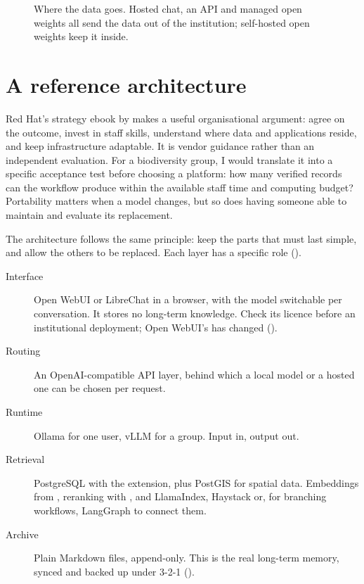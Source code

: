 \begin{figure}[htbp]
\centering
{}
\caption{Where the data goes. Hosted chat, an API and managed open weights all
send the data out of the institution; self-hosted open weights keep it
inside.}
\label{fig:datagoes}
\end{figure}

\section{A reference architecture}

Red Hat's strategy ebook by \textcite{ferris2025adaptable} makes a useful
organisational argument: agree on the outcome, invest in staff skills, understand
where data and applications reside, and keep infrastructure adaptable. It is
vendor guidance rather than an independent evaluation. For a biodiversity group,
I would translate it into a specific acceptance test before choosing a platform:
how many verified records can the workflow produce within the available staff
time and computing budget? Portability matters when a model changes, but so
does having someone able to maintain and evaluate its replacement.

The architecture follows the same principle: keep the parts that must last
simple, and allow the others to be replaced. Each layer has a specific role
().

\begin{description}
  \item[Interface] Open WebUI or LibreChat in a browser, with the model
    switchable per conversation. It stores no long-term knowledge. Check its
    licence before an institutional deployment; Open WebUI's has changed
    ().
  \item[Routing] An OpenAI-compatible API layer, behind which a local model or a
    hosted one can be chosen per request.
  \item[Runtime] Ollama for one user, vLLM for a group. Input in, output out.
  \item[Retrieval] PostgreSQL with the  extension, plus PostGIS
    for spatial data. Embeddings from , reranking with
    , and LlamaIndex, Haystack or, for branching workflows,
    LangGraph to connect them.
  \item[Archive] Plain Markdown files, append-only. This is the real long-term
    memory, synced and backed up under 3-2-1 ().
\end{description}


